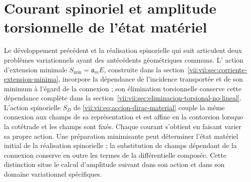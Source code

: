 
\section{Courant spinoriel et amplitude torsionnelle de l'état matériel}
\label{vii:vii:sec:corriente-espinorial-densidad}

Le développement précédent et la réalisation spinorielle qui suit articulent
deux problèmes variationnels ayant des antécédents géométriques communs. L'
action d'extension minimale \(S_{\min}=\mathfrak a_m E\), construite dans
la section~\ref{vii:vii:sec:corriente-extension-minima}, incorpore la
dépendance de l'incidence transportée et de son minimum à l'égard de la
connexion ; son élimination torsionnelle conserve cette dépendance complète dans
la section~\ref{vii:vii:sec:eliminacion-torsional-no-lineal}. L'action
spinorielle \(S_D\) de \eqref{vii:vii:eq:accion-dirac-material} couple la
même connexion aux champs de sa représentation et est affine en la
contorsion lorsque la cotétrade et les champs sont fixés. Chaque courant s'obtient
en faisant varier sa propre action. Une préparation minimisante peut déterminer
l'état matériel initial de la réalisation spinorielle ; la substitution
de champs dépendant de la connexion conserve en outre les termes
de la différentielle composée. Cette distinction situe le calcul d'amplitude
suivant dans son action et dans son domaine variationnel spécifiques.

